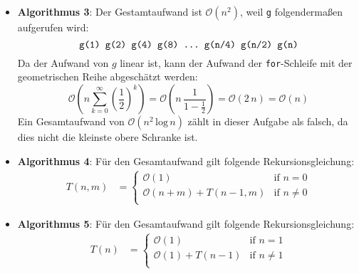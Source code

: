 \documentclass[german]{acAssignment}
\begin{document}
\begin{enumerate}
\begin{acSolution}
\begin{itemize}
                \item\textbf{Algorithmus 3}:
                    Der Gestamtaufwand ist $\mathcal{O}(n^2)$, weil \texttt{g} folgendermaßen aufgerufen wird:
                    \begin{equation*}
                        \texttt{g(1) g(2) g(4) g(8) \dots\ g(n/4) g(n/2) g(n)}
                    \end{equation*}
                    Da der Aufwand von $g$ linear ist, kann der Aufwand der \texttt{for}-Schleife mit der geometrischen Reihe abgeschätzt werden:
                    \begin{equation*}
                        \mathcal{O}\left(n \sum_{k=0}^\infty \left(\frac{1}{2}\right)^k\right)
                        = \mathcal{O}\left(n\,\frac{1}{1 - \frac{1}{2}}\right)
                        = \mathcal{O}(2\,n)
                        = \mathcal{O}(n)
                    \end{equation*}
                    Ein Gesamtaufwand von $\mathcal{O}(n^2\,\mathrm{log}\,n)$ zählt in dieser Aufgabe als falsch, da dies nicht die kleinste obere Schranke ist.
                    
                \item\textbf{Algorithmus 4}:
                    Für den Gesamtaufwand gilt folgende Rekursionsgleichung:
                    \begin{align*}
                        T(n,m) &= \begin{cases}
                            \mathcal{O}(1) & \text{if $n = 0$} \\
                            \mathcal{O}(n + m) + T(n-1,m) & \text{if $n \neq 0$} \\
                        \end{cases}
                    \end{align*}
                    
                \item\textbf{Algorithmus 5}:
                    Für den Gesamtaufwand gilt folgende Rekursionsgleichung:
                    \begin{align*}
                        T(n) &= \begin{cases}
                            \mathcal{O}(1) & \text{if $n=1$} \\
                            \mathcal{O}(1) + T(n-1) & \text{if $n \neq 1$} \\
                        \end{cases}
                    \end{align*}
            \end{itemize}
        \end{acSolution}
    

\end{enumerate}
\end{document}
